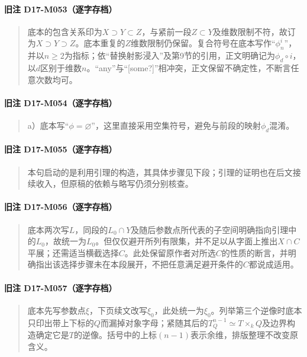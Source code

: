 \documentclass[UTF8,a4paper]{ctexbook}
\begin{document}
\paragraph*{旧注 D17-M053（逐字存档）}
\begin{quote}
底本的包含关系印为$X\supset Y\subset Z$，与紧前一段$Z\subset Y$及维数限制不符，故订为$X\supset Y\supset Z$。底本重复的$Z$维数限制仍保留。复合符号在底本写作“$\phi_n^{i}$”，并以$n\geq2$为指标；依“替换射影浸入”及第9节的引用，正文明确记为$\phi_d\circ i$，以$d$区别于维数$n$。“any”与“[some?]”相冲突，正文保留不确定性，不断言任意次数均可。
\end{quote}

\paragraph*{旧注 D17-M054（逐字存档）}
\begin{quote}
a）底本写“$\phi=\varnothing$”，这里直接采用空集符号，避免与前段的映射$\phi_d$混淆。
\end{quote}

\paragraph*{旧注 D17-M055（逐字存档）}
\begin{quote}
本句启动的是利用引理的构造，其具体步骤见下段；引理的证明也在后文接续收入，但原稿的依赖与略写仍须分别核查。
\end{quote}

\paragraph*{旧注 D17-M056（逐字存档）}
\begin{quote}
底本两次写$L$，同段的$L_0\cap Y$及随后参数点所代表的子空间明确指向引理中的$L_0$，故统一为$L_0$。但仅仅避开所列有限集，并不足以从字面上推出$X\cap C$平展；还需适当横截选择$C$。此处保留原作者对所选$C$的性质的断言，并明确指出该选择步骤未在本段展开，不把任意满足避开条件的$C$都说成适用。
\end{quote}

\paragraph*{旧注 D17-M057（逐字存档）}
\begin{quote}
底本先写参数点$\xi$，下页续文改写$\xi_0$，此处统一为$\xi_0$。列举第三个逆像时底本只印出带上下标的$Q$而漏掉对象字母；紧随其后的$T_Q^{n-1}\simeq T\times_k Q$及边界构造确定它是$T$的逆像。括号中的上标$(n-1)$表示余维，排版整理不改变原含义。
\end{quote}
\end{document}
